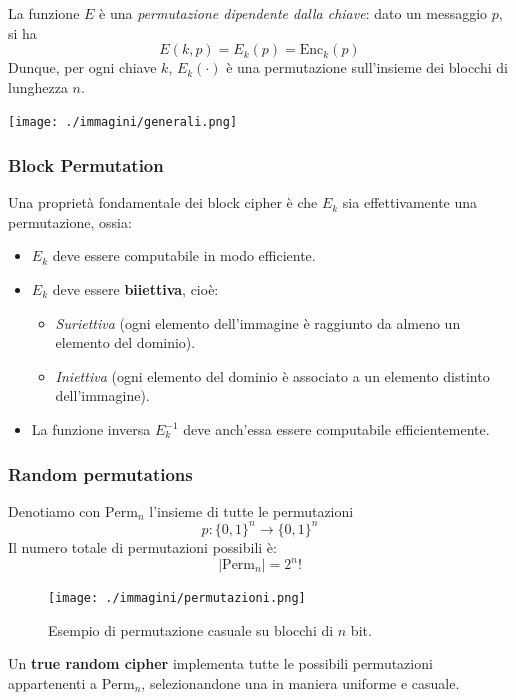\documentclass{report}
\begin{document}
La funzione $E$ è una \textit{permutazione dipendente dalla chiave}: dato un messaggio $p$, si ha
\[
E(k, p) = E_k(p) = \text{Enc}_k(p)
\]
Dunque, per ogni chiave $k$, $E_k(\cdot)$ è una permutazione sull'insieme dei blocchi di lunghezza $n$.

\texttt{[image: ./immagini/generali.png]}

\subsubsection{Block Permutation}

Una proprietà fondamentale dei block cipher è che $E_k$ sia effettivamente una permutazione, ossia:

\begin{itemize}
    \item $E_k$ deve essere computabile in modo efficiente.
    \item $E_k$ deve essere \textbf{biiettiva}, cioè:
    \begin{itemize}
        \item \textit{Suriettiva} (ogni elemento dell'immagine è raggiunto da almeno un elemento del dominio).
        \item \textit{Iniettiva} (ogni elemento del dominio è associato a un elemento distinto dell'immagine).
    \end{itemize}
    \item La funzione inversa $E_k^{-1}$ deve anch'essa essere computabile efficientemente.
\end{itemize}

\subsubsection{Random permutations}

Denotiamo con $\text{Perm}_n$ l'insieme di tutte le permutazioni
\[
p: \{0,1\}^n \rightarrow \{0,1\}^n
\]
Il numero totale di permutazioni possibili è:
\[
|\text{Perm}_n| = 2^n!
\]

\begin{figure}[h]
    \centering
    \texttt{[image: ./immagini/permutazioni.png]} %
    \caption{Esempio di permutazione casuale su blocchi di $n$ bit.}
\end{figure}

Un \textbf{true random cipher} implementa tutte le possibili permutazioni appartenenti a $\text{Perm}_n$, selezionandone una in maniera uniforme e casuale.
\end{document}
